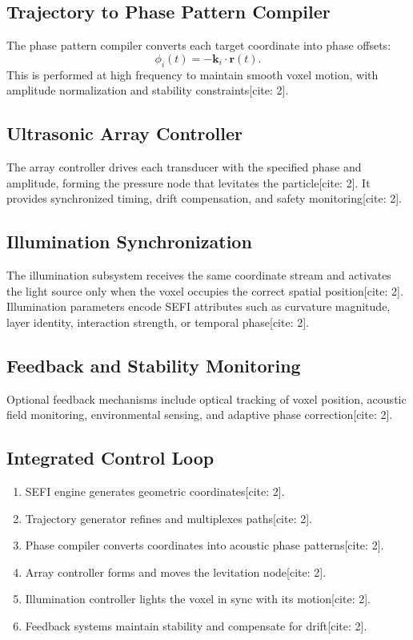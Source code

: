 \documentclass[10pt,twocolumn]{article}
\begin{document}
\subsection{Trajectory to Phase Pattern Compiler}
The phase pattern compiler converts each target coordinate into phase offsets:
\begin{equation}
\phi_{i}(t) = -\mathbf{k}_{i} \cdot \mathbf{r}(t).
\end{equation}
This is performed at high frequency to maintain smooth voxel motion, with amplitude normalization and stability constraints[cite: 2].

\subsection{Ultrasonic Array Controller}
The array controller drives each transducer with the specified phase and amplitude, forming the pressure node that levitates the particle[cite: 2]. It provides synchronized timing, drift compensation, and safety monitoring[cite: 2].

\subsection{Illumination Synchronization}
The illumination subsystem receives the same coordinate stream and activates the light source only when the voxel occupies the correct spatial position[cite: 2]. Illumination parameters encode SEFI attributes such as curvature magnitude, layer identity, interaction strength, or temporal phase[cite: 2].

\subsection{Feedback and Stability Monitoring}
Optional feedback mechanisms include optical tracking of voxel position, acoustic field monitoring, environmental sensing, and adaptive phase correction[cite: 2].

\subsection{Integrated Control Loop}
\begin{enumerate}
    \item SEFI engine generates geometric coordinates[cite: 2].
    \item Trajectory generator refines and multiplexes paths[cite: 2].
    \item Phase compiler converts coordinates into acoustic phase patterns[cite: 2].
    \item Array controller forms and moves the levitation node[cite: 2].
    \item Illumination controller lights the voxel in sync with its motion[cite: 2].
    \item Feedback systems maintain stability and compensate for drift[cite: 2].
\end{enumerate}
\end{document}
